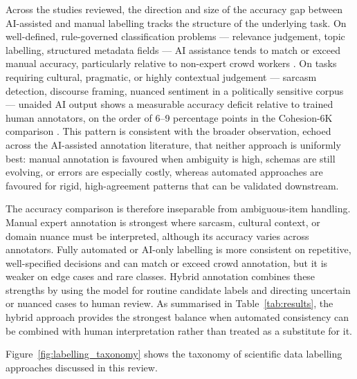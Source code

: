 \documentclass[acmsmall,nonacm]{acmart}
\begin{document}
Across the studies reviewed, the direction and size of the accuracy gap between AI-assisted and manual labelling tracks the structure of the underlying task. On well-defined, rule-governed classification problems --- relevance judgement, topic labelling, structured metadata fields --- AI assistance tends to match or exceed manual accuracy, particularly relative to non-expert crowd workers \citep{gilardi2023chatgpt,turner2025large}. On tasks requiring cultural, pragmatic, or highly contextual judgement --- sarcasm detection, discourse framing, nuanced sentiment in a politically sensitive corpus --- unaided AI output shows a measurable accuracy deficit relative to trained human annotators, on the order of 6--9 percentage points in the Cohesion-6K comparison \citep{alathba2026cohesion}. This pattern is consistent with the broader observation, echoed across the AI-assisted annotation literature, that neither approach is uniformly best: manual annotation is favoured when ambiguity is high, schemas are still evolving, or errors are especially costly, whereas automated approaches are favoured for rigid, high-agreement patterns that can be validated downstream.

The accuracy comparison is therefore inseparable from ambiguous-item handling. Manual expert annotation is strongest where sarcasm, cultural context, or domain nuance must be interpreted, although its accuracy varies across annotators. Fully automated or AI-only labelling is more consistent on repetitive, well-specified decisions and can match or exceed crowd annotation, but it is weaker on edge cases and rare classes. Hybrid annotation combines these strengths by using the model for routine candidate labels and directing uncertain or nuanced cases to human review. As summarised in Table~\ref{tab:results}, the hybrid approach provides the strongest balance when automated consistency can be combined with human interpretation rather than treated as a substitute for it.

Figure~\ref{fig:labelling_taxonomy} shows the taxonomy of scientific data labelling approaches discussed in this review.
\end{document}
